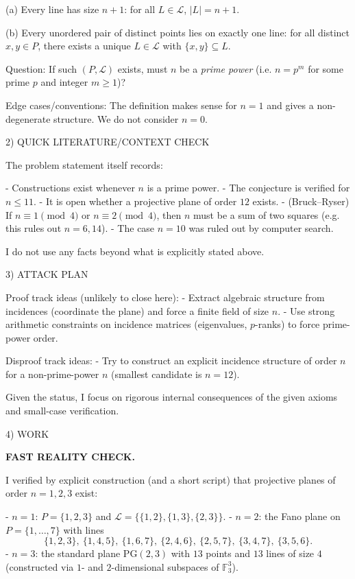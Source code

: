 (a) Every line has size $n+1$: for all $L\in\mathcal L$, $|L|=n+1$.

(b) Every unordered pair of distinct points lies on exactly one line: for all distinct $x,y\in P$, there exists a unique $L\in\mathcal L$ with $\{x,y\}\subseteq L$.

Question: If such $(P,\mathcal L)$ exists, must $n$ be a \emph{prime power} (i.e. $n=p^m$ for some prime $p$ and integer $m\ge 1$)?

Edge cases/conventions: The definition makes sense for $n=1$ and gives a non-degenerate structure. We do not consider $n=0$.

2) QUICK LITERATURE/CONTEXT CHECK

The problem statement itself records:

- Constructions exist whenever $n$ is a prime power.
- The conjecture is verified for $n\le 11$.
- It is open whether a projective plane of order $12$ exists.
- (Bruck--Ryser) If $n\equiv 1\pmod 4$ or $n\equiv 2\pmod 4$, then $n$ must be a sum of two squares (e.g. this rules out $n=6,14$).
- The case $n=10$ was ruled out by computer search.

I do not use any facts beyond what is explicitly stated above.

3) ATTACK PLAN

Proof track ideas (unlikely to close here):
- Extract algebraic structure from incidences (coordinate the plane) and force a finite field of size $n$.
- Use strong arithmetic constraints on incidence matrices (eigenvalues, $p$-ranks) to force prime-power order.

Disproof track ideas:
- Try to construct an explicit incidence structure of order $n$ for a non-prime-power $n$ (smallest candidate is $n=12$).

Given the status, I focus on rigorous internal consequences of the given axioms and small-case verification.

4) WORK

\textbf{FAST REALITY CHECK.}

I verified by explicit construction (and a short script) that projective planes of order $n=1,2,3$ exist:

- $n=1$: $P=\{1,2,3\}$ and $\mathcal L=\{\{1,2\},\{1,3\},\{2,3\}\}$.
- $n=2$: the Fano plane on $P=\{1,\dots,7\}$ with lines
  \[
  \{1,2,3\},\ \{1,4,5\},\ \{1,6,7\},\ \{2,4,6\},\ \{2,5,7\},\ \{3,4,7\},\ \{3,5,6\}.
  \]
- $n=3$: the standard plane $\mathrm{PG}(2,3)$ with $13$ points and $13$ lines of size $4$ (constructed via $1$- and $2$-dimensional subspaces of $\mathbb F_3^3$).

